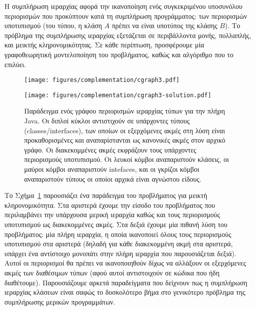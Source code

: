 Η συμπλήρωση ιεραρχίας αφορά την ικανοποίηση ενός συγκεκριμένου
υποσυνόλου περιορισμών που προκύπτουν κατά τη συμπλήρωση προγράμματος:
των περιορισμών υποτυπισμού (του τύπου, η κλάση \(A\) πρέπει να είναι
υποτύπος της κλάσης \(B\)). Το πρόβλημα της συμπλήρωσης ιεραρχίας
εξετάζεται σε περιβάλλοντα μονής, πολλαπλής, και μεικτής
κληρονομικότητας. Σε κάθε περίπτωση, προσφέρουμε μία γραφοθεωρητική
μοντελοποίηση του προβλήματος, καθώς και αλγόριθμο που το επιλύει.

{\en
\begin{figure}[th]
  \renewcommand\figurename{{\gr Σχήμα}}
  \begin{minipage}[b]{.5\linewidth}
    \centering
    \texttt{[image: figures/complementation/cgraph3.pdf]}
    \label{synopsis/fig:real-example:problem}
  \end{minipage}
  \begin{minipage}[b]{.5\linewidth}
    \centering
    \texttt{[image: figures/complementation/cgraph3-solution.pdf]}
    \label{synopsis/fig:real-example:solution}
  \end{minipage}
  \caption[]{{\gr Παράδειγμα ενός γράφου περιορισμών ιεραρχίας τύπων
      για την πλήρη {\en Java}. Οι διπλοί κύκλοι αντιστιχούν σε
      υπάρχοντες τύπους ({\en classes/interfaces}), των οποίων οι
      εξερχόμενες ακμές στη λύση είναι προκαθορισμένες και
      αναπαρίστανται ως κανονικές ακμές στον αρχικό γράφο. Οι
      διακεκομμένες ακμές εκφράζουν τους υπάρχοντες περιορισμούς
      υποτυπισμού. Οι λευκοί κόμβοι αναπαριστούν κλάσεις, οι μαύροι
      κόμβοι αναπαριστούν {\en intefaces}, και οι γκρίζοι κόμβοι
      αναπαριστούν τύπους οι οποίοι αρχικά είναι αγνώστου είδους.}}
  \label{synopsis/fig:real-example}
\end{figure}}

Το Σχήμα~\ref{synopsis/fig:real-example} παρουσιάζει ένα παράδειγμα
του προβλήματος για μεικτή κληρονομικότητα. Στα αριστερά έχουμε την
είσοδο του προβλήματος που περιλαμβάνει την υπάρχουσα μερική ιεραρχία
καθώς και τους περιορισμούς υποτυπισμού ως διακεκομμένες ακμές. Στα
δεξιά έχουμε μία πιθανή λύση του προβλήματος: μία πλήρη ιεραρχία, η
οποία ικανοποιεί όλους τους περιορισμούς υποτυπισμού στα αριστερά
(δηλαδή για κάθε διακεκομμένη ακμή στα αριστερά, υπάρχει ένα
αντίστοιχο μονοπάτι στην πλήρη ιεραρχία που παρουσιάζεται δεξιά).
Αυτοί οι περιορισμοί θα πρέπει να ικανοποιηθούν δίχως να αλλάξουν οι
εξερχόμενες ακμές των διαθέσιμων τύπων (αφού αυτοί αντιστοιχούν σε
κώδικα που ήδη διαθέτουμε). Παρουσιάζουμε αρκετά παραδείγματα που
δείχνουν πως η συμπλήρωση ιεραρχίας κλάσεων είναι σαφώς το δυσκολότερο
βήμα στο γενικότερο πρόβλημα της συμπλήρωσης μερικών προγραμμάτων.

